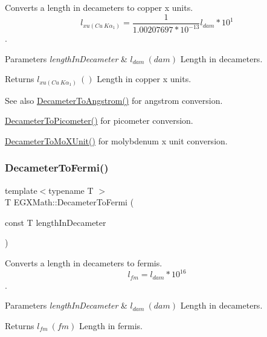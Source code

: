 Converts a length in decameters to copper x units. \[ l_{xu(Cu\ K\alpha_1)}= \frac{1}{1.00207697*10^{-13}} l_{dam} * 10^{1}\]. 


\begin{DoxyParams}{Parameters}
{\em length\+In\+Decameter} & $ l_{dam}\ (dam)$ Length in decameters. \\
\hline
\end{DoxyParams}
\begin{DoxyReturn}{Returns}
$ l_{xu(Cu\ K\alpha_1)}\ ()$ Length in copper x units. 
\end{DoxyReturn}
\begin{DoxySeeAlso}{See also}
\mbox{\hyperlink{group___e_g_x_math-_conversions-_length_conversions-_decameter-_non-_s_i_ga2ea722ea1c773432c2680fe6ebd67638}{Decameter\+To\+Angstrom()}} for angstrom conversion. 

\mbox{\hyperlink{group___e_g_x_math-_conversions-_length_conversions-_decameter-_s_i_gab265bbced03f7b08cf4ad0db29da6dfd}{Decameter\+To\+Picometer()}} for picometer conversion. 

\mbox{\hyperlink{group___e_g_x_math-_conversions-_length_conversions-_decameter-_non-_s_i_ga9e345feeb2568ded9fdceaf1d23d0ca6}{Decameter\+To\+Mo\+X\+Unit()}} for molybdenum x unit conversion. 
\end{DoxySeeAlso}
\mbox{\label{group___e_g_x_math-_conversions-_length_conversions-_decameter-_non-_s_i_gadc348f062b782f64f13784377f032f9b}} 
\subsubsection{\texorpdfstring{Decameter\+To\+Fermi()}{DecameterToFermi()}}
{\footnotesize\ttfamily template$<$typename T $>$ \\
T E\+G\+X\+Math\+::\+Decameter\+To\+Fermi (\begin{DoxyParamCaption}\item[{const T}]{length\+In\+Decameter }\end{DoxyParamCaption})}



Converts a length in decameters to fermis. \[ l_{fm}=l_{dam} * 10^{16} \]. 


\begin{DoxyParams}{Parameters}
{\em length\+In\+Decameter} & $ l_{dam}\ (dam)$ Length in decameters. \\
\hline
\end{DoxyParams}
\begin{DoxyReturn}{Returns}
$ l_{fm}\ (fm)$ Length in fermis. 
\end{DoxyReturn}
\mbox{\label{group___e_g_x_math-_conversions-_length_conversions-_decameter-_non-_s_i_gaf3c7befd051b823dc17aca5318cae689}} 
